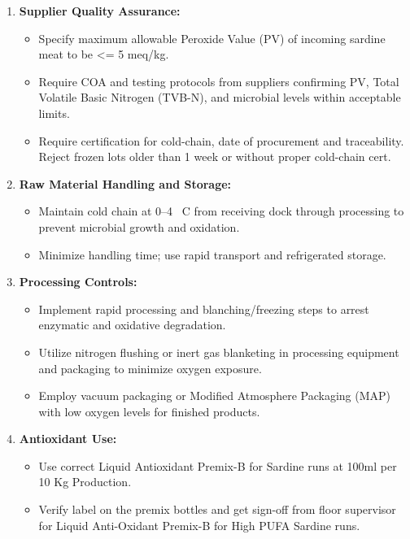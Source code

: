 \begin{enumerate}
  \item \textbf{Supplier Quality Assurance:}  
  \begin{itemize}
    \item Specify maximum allowable Peroxide Value (PV) of incoming sardine meat to be <= 5 meq/kg.  
    \item Require COA and testing protocols from suppliers confirming PV, Total Volatile Basic Nitrogen (TVB-N), and microbial levels within acceptable limits.
    \item Require certification for cold-chain, date of procurement and traceability. Reject frozen lots older than 1 week or without proper cold-chain cert.
  \end{itemize}

  \item \textbf{Raw Material Handling and Storage:}  
  \begin{itemize}
    \item Maintain cold chain at 0--4 ~\degree C from receiving dock through processing to prevent microbial growth and oxidation.  
    \item Minimize handling time; use rapid transport and refrigerated storage.
  \end{itemize}

  \item \textbf{Processing Controls:}  
  \begin{itemize}
    \item Implement rapid processing and blanching/freezing steps to arrest enzymatic and oxidative degradation.  
    \item Utilize nitrogen flushing or inert gas blanketing in processing equipment and packaging to minimize oxygen exposure.  
    \item Employ vacuum packaging or Modified Atmosphere Packaging (MAP) with low oxygen levels for finished products.
  \end{itemize}

  \item \textbf{Antioxidant Use:}  
  \begin{itemize}
    \item Use correct Liquid Antioxidant Premix-B for Sardine runs at 100ml per 10 Kg Production. 
    \item Verify label on the premix bottles and get sign-off from floor supervisor for Liquid Anti-Oxidant Premix-B for High PUFA Sardine runs.
  \end{itemize}


\end{enumerate}
